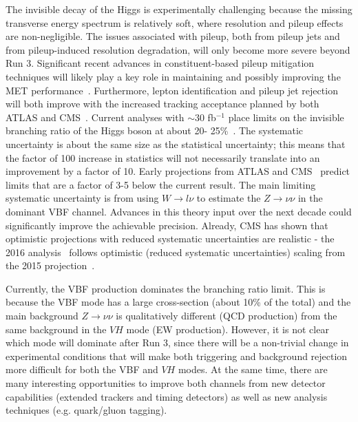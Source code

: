 \documentclass[../report.tex]{subfiles}
\begin{document}
The invisible decay of the Higgs is experimentally challenging because the missing transverse energy spectrum is relatively soft, where resolution and pileup effects are non-negligible.  The issues associated with pileup, both from pileup jets and from pileup-induced resolution degradation, will only become more severe beyond Run 3.  Significant recent advances in constituent-based pileup mitigation techniques will likely play a key role in maintaining and possibly improving the MET performance~\cite{Cacciari:2014gra,Bertolini:2014bba,Berta:2014eza,Komiske:2017ubm,Martinez:2018fwc}.  Furthermore, lepton identification and pileup jet rejection will both improve with the increased tracking acceptance planned by both ATLAS and CMS~\cite{Klein:2017nke,Collaboration:2283187,Collaboration:2283189,Collaboration:2293646,Collaboration:2017mtb,Collaboration:2285585}. Current analyses with $\sim 30$ fb$^{-1}$ place limits on the invisible branching ratio of the Higgs boson at about 20- 25\%~\cite{Khachatryan:2016whc,Aad:2015pla,Aaboud:2017bja,Aad:2015txa,Sirunyan:2018owy,Aaboud:2018sfi}.  The systematic uncertainty is about the same size as the statistical uncertainty; this means that the factor of 100 increase in statistics will not necessarily translate into an improvement by a factor of 10.  Early projections from ATLAS and CMS~\cite{CMS-PAS-FTR-16-002,ATL-PHYS-PUB-2013-014} predict limits that are a factor of 3-5 below the current result. The main limiting systematic uncertainty is from using $W\rightarrow l\nu$ to estimate the $Z\rightarrow \nu\nu$ in the dominant VBF channel. Advances in this theory input over the next decade could significantly improve the achievable precision. Already, CMS has shown that optimistic projections with reduced systematic uncertainties are realistic - the 2016 analysis~\cite{Sirunyan:2018owy} follows optimistic (reduced systematic uncertainties) scaling from the 2015 projection~\cite{CMS-PAS-FTR-16-002}.

Currently, the VBF production dominates the branching ratio limit.  This is because the VBF mode has a large cross-section (about 10\% of the total) and the main background $Z\rightarrow\nu\nu$ is qualitatively different (QCD production) from the same background in the $VH$ mode (EW production).  However, it is not clear which mode will dominate after Run 3, since there will be a non-trivial change in experimental conditions that will make both triggering and background rejection more difficult for both the VBF and $VH$ modes.  At the same time, there are many interesting opportunities to improve both channels from new detector capabilities (extended trackers and timing detectors) as well as new analysis techniques (e.g. quark/gluon tagging).
\end{document}
